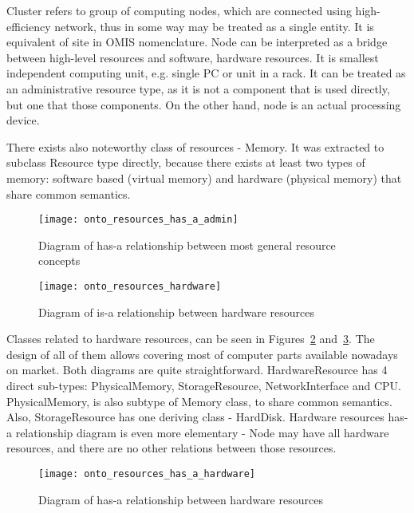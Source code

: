 Cluster refers to group of computing nodes, which are connected using high-efficiency network, thus in some way may be treated as a single entity. It is equivalent of site in OMIS nomenclature\cite{tl9702e}. Node can be interpreted as a bridge between high-level resources and software, hardware resources. It is smallest independent computing unit, e.g. single PC or unit in a rack. It can be treated as an administrative resource type, as it is not a component that is used directly, but one that those components. On the other hand, node is an actual processing device.

There exists also noteworthy class of resources - Memory. It was extracted to subclass Resource type directly, because there exists at least two types of memory: software based (virtual memory) and hardware (physical memory) that share common semantics.

\begin{figure}[ht]
\centering
\texttt{[image: onto\_resources\_has\_a\_admin]}
\caption{Diagram of has-a relationship between most general resource concepts}
\label{fig:onto_resources_has_a_admin}
\end{figure}

\pagebreak

\begin{figure}[ht]
\centering
\texttt{[image: onto\_resources\_hardware]}
\caption{Diagram of is-a relationship between hardware resources}
\label{fig:onto_resources_hardware}
\end{figure}

Classes related to hardware resources, can be seen in Figures~\ref{fig:onto_resources_hardware} and~\ref{fig:onto_resources_has_a_hardware}. The design of all of them allows covering most of computer parts available nowadays on market. Both diagrams are quite straightforward. HardwareResource has 4 direct sub-types: PhysicalMemory, StorageResource, NetworkInterface and CPU. PhysicalMemory, is also subtype of Memory class, to share common semantics. Also, StorageResource has one deriving class - HardDisk. Hardware resources has-a relationship diagram is even more elementary - Node may have all hardware resources, and there are no other relations between those resources.

\begin{figure}[ht]
\centering
\texttt{[image: onto\_resources\_has\_a\_hardware]}
\caption{Diagram of has-a relationship between hardware resources}
\label{fig:onto_resources_has_a_hardware}
\end{figure}


